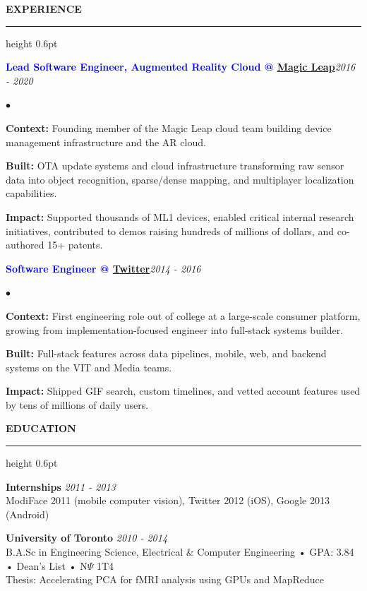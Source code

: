 \documentclass[10pt]{resume}
\newenvironment{rSectionCompact}[1]{
  \medskip
  \vspace{0.45em}
  \textbf{\textcolor{Cerulean}{\MakeUppercase{#1}}}
  \vspace{0.3em}
  {\color{Blue}\hrule height 0.6pt}
  \vspace{0.85em}
  \begin{list}{}{
    \setlength{\leftmargin}{0em}
  }
  \item[]
}{
    \vspace{0.25em}
    \end{list}
}
\newenvironment{rJobCompact}[2]{
  \normalsize
  \textcolor{Blue}{\textbf{#1}}\hfill\textit{#2}
  \vspace{0.08em}
  \begin{list}{$\bullet$}{
    \setlength{\leftmargin}{1.6em}
    \setlength{\itemsep}{-0.05em}
    \setlength{\topsep}{0pt}
    \setlength{\partopsep}{0pt}
    \setlength{\parsep}{0pt}
  }
}{
    \end{list}
    \vspace{0.42em}
}
\begin{document}
\begin{rSectionCompact}{Experience}
    \begin{rJobCompact}{Lead Software Engineer, Augmented Reality Cloud @ \href{https://magicleap.com}{Magic Leap}}{2016 - 2020}
        \item \textbf{Context:} Founding member of the Magic Leap cloud team building device management infrastructure and the AR cloud.
        \item \textbf{Built:} OTA update systems and cloud infrastructure transforming raw sensor data into object recognition, sparse/dense mapping, and multiplayer localization capabilities.
        \item \textbf{Impact:} Supported thousands of ML1 devices, enabled critical internal research initiatives, contributed to demos raising hundreds of millions of dollars, and co-authored 15+ patents.
    \end{rJobCompact}

    \begin{rJobCompact}{Software Engineer @ \href{https://twitter.com}{Twitter}}{2014 - 2016}
        \item \textbf{Context:} First engineering role out of college at a large-scale consumer platform, growing from implementation-focused engineer into full-stack systems builder.
        \item \textbf{Built:} Full-stack features across data pipelines, mobile, web, and backend systems on the VIT and Media teams.
        \item \textbf{Impact:} Shipped GIF search, custom timelines, and vetted account features used by tens of millions of daily users.
    \end{rJobCompact}

\end{rSectionCompact}


\begin{rSectionCompact}{Education}
    \textbf{Internships} \hfill \textit{2011 - 2013} \\
    ModiFace 2011 (mobile computer vision), Twitter 2012 (iOS), Google 2013 (Android)

    \vspace{0.25em}
    \textbf{University of Toronto} \hfill \textit{2010 - 2014} \\
    B.A.Sc in Engineering Science, Electrical \& Computer Engineering • GPA: 3.84 • Dean's List • N$\Psi$ 1T4 \\
    Thesis: Accelerating PCA for fMRI analysis using GPUs and MapReduce

\end{rSectionCompact}
\end{document}
